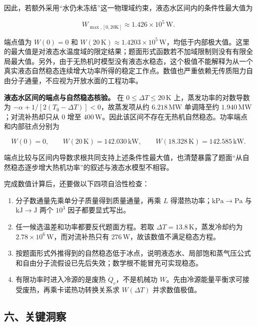 \documentclass[12pt,a4paper,UTF8]{ctexart}
\newcommand{\tightlist}{\setlength{\itemsep}{0pt}\setlength{\parskip}{0pt}}
\begin{document}
因此，若额外采用``水仍未冻结''这一物理域约束，液态水区间内的条件性最大值为

\[
\boxed{W_{\max,[0,20\mathrm K]}\approx1.426\times10^5\,\mathrm W}.
\]

端点值为 \(W(0)=0\) 和
\(W(20\,\mathrm K)\approx1.4203\times10^5\,\mathrm W\)，均低于内部极大值。这里的最大值是对液态水温度域的限定结果；题面形式函数若不加域限制则没有有限全局最大值。另外，由于无热机时模型没有液态水稳态，这个极值不能解释为从一个真实液态自然稳态连续增大功率所得的稳定工作点。数值也严重依赖无传质阻力自由分子通量，不应视为开放水面的工程功率。

\textbf{液态水区间的端点与自然稳态核验。} 在
\(0\leq\Delta T\leq20\,\mathrm K\) 上，蒸发功率的对数导数为
\(-\alpha+1/[2(T_0-\Delta T)]<0\)，故蒸发项从约 \(6.218\,\mathrm{MW}\)
单调降至约 \(1.940\,\mathrm{MW}\)；对流补热却只从 \(0\) 增至
\(400\,\mathrm W\)。因此该区间不存在无热机自然稳态。功率端点和内部驻点分别为

\[
W(0)=0,\qquad W(20\,\mathrm K)=142.030\,\mathrm{kW},\qquad W(18.328\,\mathrm K)=142.585\,\mathrm{kW}.
\]

端点比较与区间内导数求根共同支持上述条件性最大值，也清楚暴露了题面``从自然稳态逐步增大热机功率''的叙述与液态水模型不相容。

完成数值计算后，还要做以下四项自洽性检查：

\begin{enumerate}
\def\labelenumi{\arabic{enumi}.}
\tightlist
\item
  分子数通量先乘单分子质量得到质量通量，再乘 \(L\)
  得潜热功率；\(\mathrm{kPa\to Pa}\) 与 \(\mathrm{kJ\to J}\) 两个
  \(10^3\) 因子都要显式写出。
\item
  任一候选温差和功率都要反代题面方程。若取
  \(\Delta T=13.8\,\mathrm K\)，蒸发冷却约为
  \(2.78\times10^6\,\mathrm W\)，而对流补热只有
  \(276\,\mathrm W\)，故该数值不满足稳态方程。
\item
  按题面形式外推得到的自然稳态低于冰点，说明液态水、局部饱和蒸气压公式和自由分子流假设已先后失效；数学根不能冒充可实现稳态。
\item
  有限功率时进入冷源的是废热 \(\dot Q_c\)，不是机械功
  \(W\)。先由冷源能量平衡求可接受废热，再乘卡诺热功转换关系求
  \(W(\Delta T)\) 并求数值极值。
\end{enumerate}

\subsection{六、关键洞察}\label{ux516dux5173ux952eux6d1eux5bdf-6}
\end{document}
